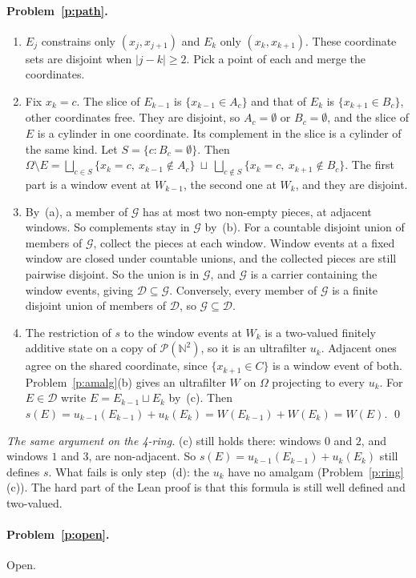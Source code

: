 \documentclass[11pt]{article}
\theoremstyle{definition}
\theoremstyle{remark}
\newcommand{\bbN}{\mathbb{N}}
\newcommand{\cD}{\mathcal{D}}
\begin{document}
\paragraph{Problem~\ref{p:path}.}
\begin{enumerate}[label=(\alph*)]
  \item $E_j$ constrains only $(x_j,x_{j+1})$ and $E_k$ only $(x_k,x_{k+1})$.
    These coordinate sets are disjoint when $|j-k|\ge2$. Pick a point of each and
    merge the coordinates.
  \item Fix $x_k=c$. The slice of $E_{k-1}$ is $\{x_{k-1}\in A_c\}$ and that of
    $E_k$ is $\{x_{k+1}\in B_c\}$, other coordinates free. They are disjoint, so
    $A_c=\emptyset$ or $B_c=\emptyset$, and the slice of $E$ is a cylinder in one
    coordinate. Its complement in the slice is a cylinder of the same kind. Let
    $S=\{c:B_c=\emptyset\}$. Then
    $\Omega\setminus E=\bigsqcup_{c\in S}\{x_k=c,\ x_{k-1}\notin A_c\}\ \sqcup\
    \bigsqcup_{c\notin S}\{x_k=c,\ x_{k+1}\notin B_c\}$. The first part is a
    window event at $W_{k-1}$, the second one at $W_k$, and they are disjoint.
  \item By~(a), a member of $\mathcal G$ has at most two non-empty pieces, at
    adjacent windows. So complements stay in $\mathcal G$ by~(b). For a countable
    disjoint union of members of $\mathcal G$, collect the pieces at each window.
    Window events at a fixed window are closed under countable unions, and the
    collected pieces are still pairwise disjoint. So the union is in
    $\mathcal G$, and $\mathcal G$ is a carrier containing the window events,
    giving $\cD\subseteq\mathcal G$. Conversely, every member of $\mathcal G$ is a
    finite disjoint union of members of $\cD$, so $\mathcal G\subseteq\cD$.
  \item The restriction of $s$ to the window events at $W_k$ is a two-valued
    finitely additive state on a copy of $\mathcal P(\bbN^2)$, so it is an
    ultrafilter $u_k$. Adjacent ones agree on the shared coordinate, since
    $\{x_{k+1}\in C\}$ is a window event of both. Problem~\ref{p:amalg}(b) gives
    an ultrafilter $W$ on $\Omega$ projecting to every $u_k$. For $E\in\cD$ write
    $E=E_{k-1}\sqcup E_k$ by~(c). Then $s(E)=u_{k-1}(E_{k-1})+u_k(E_k)
    =W(E_{k-1})+W(E_k)=W(E)$. \qed
\end{enumerate}
\emph{The same argument on the 4-ring.} (c) still holds there: windows $0$ and
$2$, and windows $1$ and $3$, are non-adjacent. So
$s(E)=u_{k-1}(E_{k-1})+u_k(E_k)$ still defines $s$. What fails is only
step~(d): the $u_k$ have no amalgam (Problem~\ref{p:ring}(c)). The hard part of
the Lean proof is that this formula is still well defined and two-valued.

\paragraph{Problem~\ref{p:open}.} Open.
\end{document}
